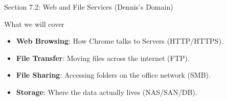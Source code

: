 \documentclass[aspectratio=169]{beamer}  %
\begin{document}
\begin{frame}{Section 7.2: Web and File Services (Dennis's Domain)}
    \begin{center}
    \end{center}
    
    \vspace{0.5cm}
    \begin{block}{What we will cover}
        \small
        \begin{itemize}
            \item \textbf{Web Browsing}: How Chrome talks to Servers (HTTP/HTTPS).
            \item \textbf{File Transfer}: Moving files across the internet (FTP).
            \item \textbf{File Sharing}: Accessing folders on the office network (SMB).
            \item \textbf{Storage}: Where the data actually lives (NAS/SAN/DB).
        \end{itemize}
    \end{block}
\end{frame}
\end{document}
